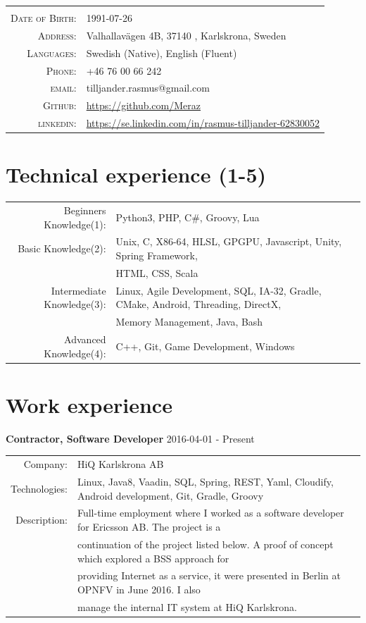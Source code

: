 \documentclass[a4paper,10pt]{article}
\begin{document}
\begin{tabular}{rl}
    \textsc{} &    \\
    \textsc{Date of Birth:} &  1991-07-26   \\
    \textsc{Address:}   & Valhallavägen 4B, 37140 , Karlskrona, Sweden \\
    \textsc{Languages:}  & Swedish (Native), English (Fluent) \\
    \textsc{Phone:}     & +46 76 00 66 242\\
    \textsc{email:}     & tilljander.rasmus@gmail.com\\
    \textsc{Github:}  & \url{https://github.com/Meraz}\\
    \textsc{linkedin:}  & \url{https://se.linkedin.com/in/rasmus-tilljander-62830052}
\end{tabular}
\section{Technical experience (1-5)}
\begin{tabular}{rl}
Beginners Knowledge(1):& Python3, PHP, C\#, Groovy, Lua\\
Basic Knowledge(2):& Unix, C, X86-64, HLSL, GPGPU, Javascript, Unity, Spring Framework,\\& HTML, CSS, Scala \\
Intermediate Knowledge(3):& Linux, Agile Development, SQL, IA-32, Gradle, CMake, Android, Threading,  DirectX, \\& Memory Management, Java, Bash\\
Advanced Knowledge(4):& C++, Git, Game Development, Windows
\end{tabular}

\section{Work experience}
\textbf{Contractor, Software Developer} 2016-04-01 - Present \\
\begin{tabular}{rl}
Company:& HiQ Karlskrona AB \\
Technologies:&  Linux, Java8, Vaadin, SQL, Spring, REST, Yaml, Cloudify, Android development, Git, Gradle, Groovy\\
Description:& Full-time employment where I worked as a software developer for Ericsson AB. The project is a\\&
continuation of the project listed below. A proof of concept which explored a BSS approach for\\&
providing Internet as a service, it were presented in Berlin at OPNFV in June 2016. I also\\&
manage the internal IT system at HiQ Karlskrona.
\end{tabular}\\
\end{document}
